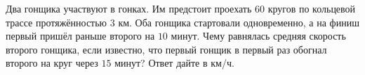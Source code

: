 \begin{ex}
	\begin{condition}
		Два гонщика участвуют в гонках. Им предстоит проехать \(60\) кругов по кольцевой трассе протяжённостью \(3\) км. Оба гонщика стартовали одновременно, а на финиш первый пришёл раньше второго на \(10\) минут. Чему равнялась средняя скорость второго гонщика, если известно, что первый гонщик в первый раз обогнал второго на круг через \(15\) минут? Ответ дайте в км/ч.
	\end{condition}
\end{ex}